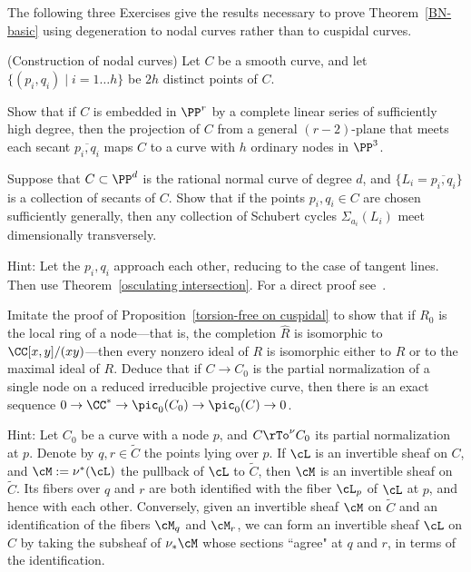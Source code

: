 The following three Exercises give the results necessary to prove Theorem~\ref{BN-basic} using degeneration to
nodal curves rather than to cuspidal curves. 

\begin{exercise}\label{independent secants}\label{Constructing nodal curves} (Construction of nodal curves) Let $C$ be a smooth curve,
and let
 $\{(p_{i}, q_{i}) \mid i = 1\dots h\}$ be $2h$ distinct points of $C$.
 
Show that if $C$ is embedded in $\PP^{r}$ by a complete linear series of sufficiently high degree, then the
projection of $C$ from a general $(r-2)$-plane that meets each secant $\overline{p_{i}, q_{i}}$
maps $C$ to a curve with $h$ ordinary nodes in $\PP^{3}$.
\end{exercise}

\begin{exercise}\label{BN via nodal curves}\label{secant general position}
Suppose that $C\subset \PP^{d}$ is the rational normal curve of degree $d$, and $\{L_{i} = \overline{p_{i},q_{i}}\}$
is a collection of secants of $C$. Show that if the points $p_{i}, q_{i}\in C$ are chosen sufficiently generally,
then any collection of Schubert cycles $\Sigma_{a_{i}}(L_{i})$ meet dimensionally transversely.

Hint: Let the $p_{i}, q_{i}$ approach each other, reducing to the case of tangent lines. Then use
Theorem~\ref{osculating intersection}. For a direct proof see~\cite[Lemma, p. 259]{Griffiths-Harris-BN}.
\end{exercise}

\begin{exercise}\label{linear series on a nodal curve}
Imitate the proof of Proposition~\ref{torsion-free on cuspidal} to show that if $R_{0}$ is the local ring of a node---that is, the completion $\widehat R$ is isomorphic to $\CC[x,y]/(xy)$---then every nonzero ideal of $R$ is isomorphic
either to $R$ or to the maximal ideal of $R$. Deduce that if $C\to C_{0}$ is the
partial normalization of a single node on a reduced irreducible projective curve, then there is an exact sequence
$0\to \CC^{*} \to \pic_{0}(C_{0}) \to \pic_{0}(C) \to 0$.

Hint:
Let $C_{0}$ be a curve with a node $p$, and $C \rTo^\nu C_{0}$ its partial normalization at $p$. Denote by $q,r \in \widetilde C$ the points lying over $p$. If $\cL$ is an invertible sheaf on $C$, and $\cM := \nu^*(\cL)$ the pullback of $\cL$ to $\widetilde C$, then $\cM$ is an invertible sheaf on $\widetilde C$. Its fibers over $q$ and $r$ are both identified with the fiber $\cL_p$ of $\cL$ at $p$, and hence with each other. Conversely, given an invertible sheaf $\cM$ on $\widetilde C$ and an identification of the fibers $\cM_q$ and $\cM_r$, we can form an invertible sheaf $\cL$ on $C$ by taking the subsheaf of $\nu_*\cM$ whose sections ``agree" at $q$ and $r$, in terms of the identification. 
\end{exercise}
 

